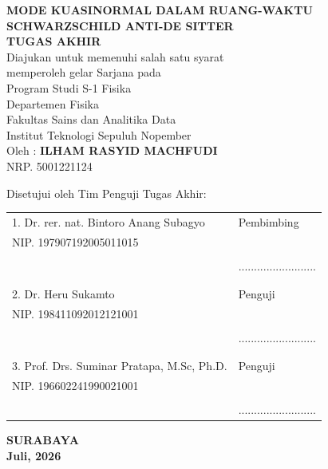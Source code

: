 \begin{center}
\vspace{4mm}
\textbf{MODE KUASINORMAL DALAM RUANG-WAKTU SCHWARZSCHILD ANTI-DE SITTER} \\
\vspace{4mm}
\textbf{TUGAS AKHIR} \\
\vspace{4mm}
Diajukan untuk memenuhi salah satu syarat \\
memperoleh gelar Sarjana pada\\
Program Studi S-1 Fisika \\
Departemen Fisika \\
Fakultas Sains dan Analitika Data \\
Institut Teknologi Sepuluh Nopember\\
\vspace{4mm}
Oleh : \textbf{ILHAM RASYID MACHFUDI} \\
\vspace{1mm}
NRP. 5001221124 \\
\vspace{4mm}
\begin{center}
    Disetujui oleh Tim Penguji Tugas Akhir:
\end{center}

\vspace{4ex}

\begingroup
\setlength{\tabcolsep}{0pt}

\noindent
\begin{tabularx}{\textwidth}{X l}
    1. Dr. rer. nat. Bintoro Anang Subagyo      & Pembimbing \\
    NIP. 197907192005011015                      &  \\
    &  \\
    &.........................  \\
    &  \\
    &  \\
    2. Dr. Heru Sukamto & Penguji\\
    NIP. 198411092012121001 & \\
    &  \\
    & ......................... \\
    &  \\
    &  \\
    3. Prof. Drs. Suminar Pratapa, M.Sc, Ph.D. & Penguji\\
    NIP. 196602241990021001 &  \\
    &  \\
    & .........................\\
\end{tabularx}
\endgroup
  \begin{center}
    \textbf{SURABAYA\\Juli, 2026}
\end{center}
\end{center}

